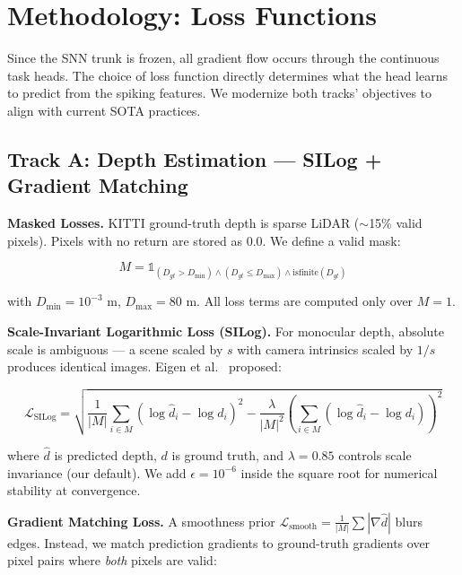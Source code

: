 \documentclass[10pt,conference]{IEEEtran}
\begin{document}
\section{Methodology: Loss Functions}
\label{sec:methodology_losses}

Since the SNN trunk is frozen, all gradient flow occurs through the continuous task heads. The choice of loss function directly determines what the head learns to predict from the spiking features. We modernize both tracks' objectives to align with current SOTA practices.

\subsection{Track A: Depth Estimation — SILog + Gradient Matching}
\label{sec:depth_loss}

\textbf{Masked Losses.} KITTI ground-truth depth is sparse LiDAR ($\sim$15\% valid pixels). Pixels with no return are stored as 0.0. We define a valid mask:

\begin{equation}
    M = \mathbb{1}_{(D_{gt} > D_{\min}) \land (D_{gt} \le D_{\max}) \land \text{isfinite}(D_{gt})}
\end{equation}

with $D_{\min} = 10^{-3}$ m, $D_{\max} = 80$ m. All loss terms are computed only over $M=1$.

\textbf{Scale-Invariant Logarithmic Loss (SILog).} For monocular depth, absolute scale is ambiguous — a scene scaled by $s$ with camera intrinsics scaled by $1/s$ produces identical images. Eigen et al.~\cite{eigen2014depth} proposed:

\begin{equation}
    \mathcal{L}_{\text{SILog}} = \sqrt{ \frac{1}{|M|} \sum_{i \in M} (\log \hat{d}_i - \log d_i)^2 - \frac{\lambda}{|M|^2} \left( \sum_{i \in M} (\log \hat{d}_i - \log d_i) \right)^2 }
\end{equation}

where $\hat{d}$ is predicted depth, $d$ is ground truth, and $\lambda=0.85$ controls scale invariance (our default). We add $\epsilon=10^{-6}$ inside the square root for numerical stability at convergence.

\textbf{Gradient Matching Loss.} A smoothness prior $\mathcal{L}_{\text{smooth}} = \frac{1}{|M|} \sum |\nabla \hat{d}|$ blurs edges. Instead, we match prediction gradients to ground-truth gradients over pixel pairs where \textit{both} pixels are valid:
\end{document}
